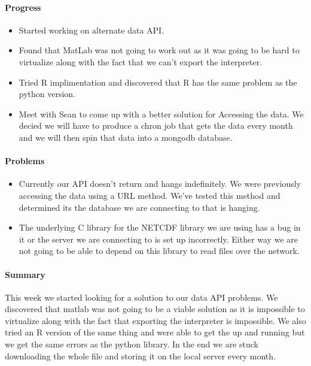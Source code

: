 \documentclass[onecolumn, draftclsnofoot,10pt, compsoc]{article}
\begin{document}
		    \paragraph{Progress} \hfill \break
		        \begin{itemize}
		            \item Started working on alternate data API.
		            \item Found that MatLab was not going to work out as it was going to be hard to virtualize along with the fact that we can't export the interpreter.\\
		            \item Tried R implimentation and discovered that R has the same problem as the python version.\\
		            \item Meet with Sean to come up with a better solution for Accessing the data. We decied we will have to produce a chron job that gets the data every month and we will then spin that data into a mongodb database.\\
		        \end{itemize}
		    \paragraph{Problems} \hfill \break
		        \begin{itemize}
		            \item Currently our API doesn't return and hangs indefinitely. We were previously accessing the data using a URL method. We've tested this method and determined its the database we are connecting to that is hanging.
		            \item The underlying C library for the NETCDF library we are using has a bug in it or the server we are connecting to is set up incorrectly. Either way we are not going to be able to depend on this library to read files over the network.\\
		        \end{itemize}
		    \paragraph{Summary} \hfill \break
		        This week we started looking for a solution to our data API problems. We discovered that matlab was not going to be a viable solution as it is impossible to virtualize along with the fact that exporting the interpreter is impossible. We also tried an R version of the same thing and were able to get the up and running but we get the same errors as the python library. In the end we are stuck downloading the whole file and storing it on the local server every month.\\
\end{document}
